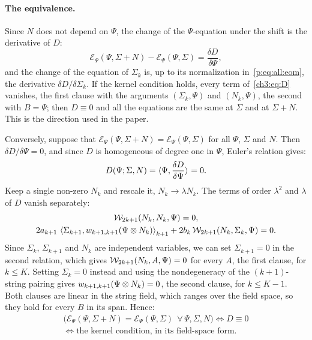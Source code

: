 \paragraph{The equivalence.}

Since $N$ does not depend on $\Psi$, the change of the $\Psi$-equation under the shift is the derivative of $D$:
\begin{equation}
  \label{ch3:eq:delta-E}
  \mathcal E_\Psi(\Psi, \Sigma + N) - \mathcal E_\Psi(\Psi, \Sigma)
    = \frac{\delta D}{\delta \Psi},
\end{equation}
and the change of the equation of $\Sigma_k$ is, up to its normalization in~\eqref{p:eq:all:eom}, the derivative $\delta D / \delta \Sigma_k$.
If the kernel condition holds, every term of~\eqref{ch3:eq:D} vanishes, the first clause with the arguments $(\Sigma_k, \Psi)$ and $(N_k, \Psi)$, the second with $B = \Psi$; then $D \equiv 0$ and all the equations are the same at $\Sigma$ and at $\Sigma + N$.
This is the direction used in the paper.

Conversely, suppose that $\mathcal E_\Psi(\Psi, \Sigma + N) = \mathcal E_\Psi(\Psi, \Sigma)$ for all $\Psi$, $\Sigma$ and $N$.
Then $\delta D / \delta \Psi = 0$, and since $D$ is homogeneous of degree one in $\Psi$, Euler's relation gives:
\begin{equation}
  \label{ch3:eq:euler}
  D(\Psi; \Sigma, N)
    = \pair{\Psi}{\frac{\delta D}{\delta \Psi}}
    = 0.
\end{equation}
Keep a single non-zero $N_k$ and rescale it, $N_k \to \lambda N_k$.
The terms of order $\lambda^2$ and $\lambda$ of $D$ vanish separately:
\begin{equation}
  \label{ch3:eq:lambda}
  \begin{gathered}
    \dvertex{2 k + 1}(N_k, N_k, \Psi)
      = 0,
    \\
    2 a_{k + 1} \, \pair[k + 1]{\Sigma_{k + 1}}{\wprod{k + 1}{k + 1}(\Psi \otimes N_k)}
      + 2 b_k \, \dvertex{2 k + 1}(N_k, \Sigma_k, \Psi)
      = 0.
  \end{gathered}
\end{equation}
Since $\Sigma_k$, $\Sigma_{k + 1}$ and $N_k$ are independent variables, we can set $\Sigma_{k + 1} = 0$ in the second relation, which gives $\dvertex{2 k + 1}(N_k, A, \Psi) = 0$ for every $A$, the first clause, for $k \le K$.
Setting $\Sigma_k = 0$ instead and using the nondegeneracy of the $(k + 1)$-string pairing gives $\wprod{k + 1}{k + 1}(\Psi \otimes N_k) = 0$, the second clause, for $k \le K - 1$.
Both clauses are linear in the string field, which ranges over the field space, so they hold for every $B$ in its span.
Hence:
\begin{equation}
  \label{ch3:eq:converse}
  \begin{gathered}
    \Big(
      \mathcal E_\Psi(\Psi, \Sigma + N)
        = \mathcal E_\Psi(\Psi, \Sigma)
      \ \ \forall \, \Psi, \Sigma, N
    \Big)
    \iff
    D \equiv 0
    \\
    \iff
    \text{the kernel condition, in its field-space form}.
  \end{gathered}
\end{equation}

